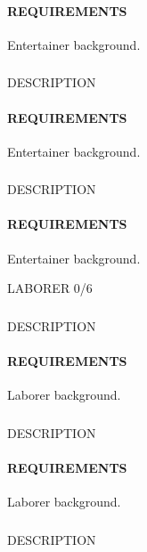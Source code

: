     \paragraph{REQUIREMENTS} Entertainer background.

    \subsubsection{} \label{feat::NAME}
    DESCRIPTION
    \paragraph{REQUIREMENTS} Entertainer background.

    \subsubsection{} \label{feat::NAME}
    DESCRIPTION
    \paragraph{REQUIREMENTS} Entertainer background.

LABORER 0/6
    \subsubsection{} \label{feat::NAME}
    DESCRIPTION
    \paragraph{REQUIREMENTS} Laborer background.

    \subsubsection{} \label{feat::NAME}
    DESCRIPTION
    \paragraph{REQUIREMENTS} Laborer background.

    \subsubsection{} \label{feat::NAME}
    DESCRIPTION
